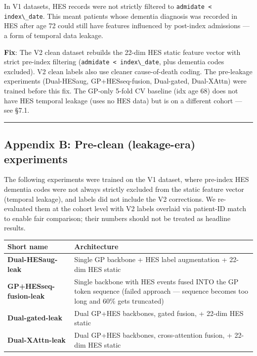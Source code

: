 \documentclass[
  11pt,
]{article}
\newcommand{\passthrough}[1]{#1}
\newcounter{none} %
\begin{document}
In V1 datasets, HES records were not strictly filtered to
\passthrough{\lstinline!admidate < index\_date!}. This meant patients
whose dementia diagnosis was recorded in HES after age 72 could still
have features influenced by post-index admissions --- a form of temporal
data leakage.

\textbf{Fix}: The V2 clean dataset rebuilds the 22-dim HES static
feature vector with strict pre-index filtering
(\passthrough{\lstinline!admidate < index\_date!}, plus dementia codes
excluded). V2 clean labels also use cleaner cause-of-death coding. The
pre-leakage experiments (Dual-HESaug, GP+HESseq-fusion, Dual-gated,
Dual-XAttn) were trained before this fix. The GP-only 5-fold CV baseline
(idx age 68) does not have HES temporal leakage (uses no HES data) but
is on a different cohort --- see §7.1.

\begin{center}\rule{0.5\linewidth}{0.5pt}\end{center}

\subsection{Appendix B: Pre-clean (leakage-era)
experiments}\label{appendix-b-pre-clean-leakage-era-experiments}

The following experiments were trained on the V1 dataset, where
pre-index HES dementia codes were not always strictly excluded from the
static feature vector (temporal leakage), and labels did not include the
V2 corrections. We re-evaluated them at the cohort level with V2 labels
overlaid via patient-ID match to enable fair comparison; their numbers
should not be treated as headline results.

{\def\LTcaptype{none} %
\begin{longtable}[]{|>{\raggedright\arraybackslash}p{}|>{\raggedright\arraybackslash}p{}|}
\hline
\begin{minipage}[b]{\linewidth}\raggedright
Short name
\end{minipage} & \begin{minipage}[b]{\linewidth}\raggedright
Architecture
\end{minipage} \\
\hline
\hline
\endhead
\hline
\endlastfoot
\textbf{Dual-HESaug-leak} & Single GP backbone + HES label augmentation
+ 22-dim HES static \\
\hline
\textbf{GP+HESseq-fusion-leak} & Single backbone with HES events fused
INTO the GP token sequence (failed approach --- sequence becomes too
long and 60\% gets truncated) \\
\hline
\textbf{Dual-gated-leak} & Dual GP+HES backbones, gated fusion, + 22-dim
HES static \\
\hline
\textbf{Dual-XAttn-leak} & Dual GP+HES backbones, cross-attention
fusion, + 22-dim HES static \\
\hline
\end{longtable}
}
\end{document}
